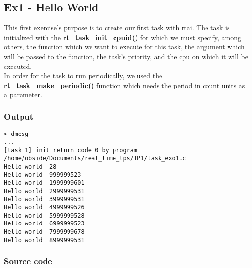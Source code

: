 \subsection{Ex1 - Hello World}
This first exercise's purpose is to create our first task with rtai. The task is initialized with the \textbf{rt\_task\_init\_cpuid()} for which we must specify, among others, the function which we want to execute for this task, the argument which will be passed to the function, the task's priority, and the cpu on which it will be executed.\\

In order for the task to run periodically, we used the \textbf{rt\_task\_make\_periodic()} function which needs the period in count units as a parameter.

\subsubsection{Output}
\begin{lstlisting}[keywordstyle=\color{black}]
> dmesg
...
[task 1] init return code 0 by program /home/obside/Documents/real_time_tps/TP1/task_exo1.c
Hello world  28
Hello world  999999523
Hello world  1999999601
Hello world  2999999531
Hello world  3999999531
Hello world  4999999526
Hello world  5999999528
Hello world  6999999523
Hello world  7999999678
Hello world  8999999531
\end{lstlisting}

\subsubsection{Source code}

